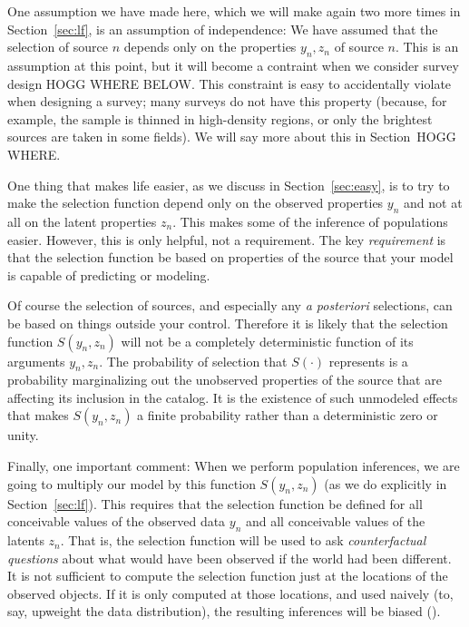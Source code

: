 \documentclass[modern]{aastex62}
\newcommand{\sectionname}{Section}
\newcommand{\foreign}[1]{\textsl{#1}}
\begin{document}
One assumption we have made here, which we will make again two
more times in \sectionname~\ref{sec:lf}, is an assumption of
independence:
We have assumed that the selection of source $n$ depends only on
the properties $y_n, z_n$ of source $n$.
This is an assumption at this point, but it will become a contraint
when we consider survey design HOGG WHERE BELOW.
This constraint is easy to accidentally violate when designing a
survey; many surveys do not have this property (because, for example,
the sample is thinned in high-density regions, or only the brightest
sources are taken in some fields).
We will say more about this in \sectionname~HOGG WHERE.

One thing that makes life easier, as we discuss in \sectionname~\ref{sec:easy},
is to try to make the selection function depend only on the observed
properties $y_n$ and not at all on the latent properties $z_n$.
This makes some of the inference of populations easier.
However, this is only helpful, not a requirement.
The key \emph{requirement} is that the selection function be based
on properties of the source that your model is capable of predicting
or modeling.

Of course the selection of sources, and especially any \foreign{a
  posteriori} selections, can be based on things outside your control.
Therefore it is likely that the selection function $S(y_n, z_n)$ will
not be a completely deterministic function of its arguments $y_n, z_n$.
The probability of selection that $S(\cdot)$ represents is a
probability marginalizing out the unobserved properties of the source
that are affecting its inclusion in the catalog.
It is the existence of such unmodeled effects that makes $S(y_n, z_n)$
a finite probability rather than a deterministic zero or unity.

Finally, one important comment: When we perform population inferences,
we are going to multiply our model by this function $S(y_n, z_n)$ (as
we do explicitly in \sectionname~\ref{sec:lf}).
This requires that the selection function be defined for all
conceivable values of the observed data $y_n$ and all conceivable
values of the latents $z_n$.
That is, the selection function will be used to ask
\emph{counterfactual questions} about what would have been observed if
the world had been different.
It is not sufficient to compute the selection function just at the
locations of the observed objects.
If it is only computed at those locations, and used naively (to, say,
upweight the data distribution), the resulting inferences will be 
biased (\citealt{blogpost}).
\end{document}
